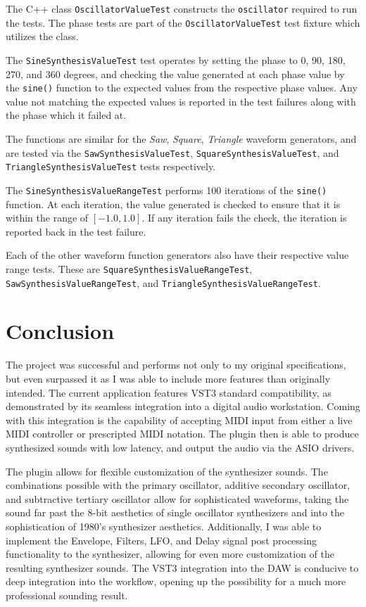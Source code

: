 \documentclass[a4paper,12pt]{report}
\begin{document}
The C++ class \texttt{Oscillator\-Value\-Test} constructs the \texttt{oscillator} required to run the tests. The phase tests are part of the \texttt{Oscillator\-Value\-Test} test fixture which utilizes the class.

The \texttt{Sine\-Synthesis\-Value\-Test} test operates by setting the phase to 0, 90, 180, 270, and 360 degrees, and checking the value generated at each phase value by the \texttt{sine()} function to the expected values from the respective phase values. Any value not matching the expected values is reported in the test failures along with the phase which it failed at.

The functions are similar for the \emph{Saw}, \emph{Square}, \emph{Triangle} waveform generators, and are tested via the \texttt{Saw\-Synthesis\-Value\-Test}, \texttt{Square\-Synthesis\-Value\-Test}, and \texttt{Triangle\-Synthesis\-Value\-Test} tests respectively.

The \texttt{Sine\-Synthesis\-Value\-Range\-Test} performs 100 iterations of the \texttt{sine()} function. At each iteration, the value generated is checked to ensure that it is within the range of $[-1.0,1.0]$. If any iteration fails the check, the iteration is reported back in the test failure.

Each of the other waveform function generators also have their respective value range tests. These are \texttt{Square\-Synthesis\-Value\-Range\-Test}, \texttt{Saw\-Synthesis\-Value\-Range\-Test}, and \texttt{Triangle\-Synthesis\-Value\-Range\-Test}.

\chapter*{Conclusion}
\label{chapter:results}
The project was successful and performs not only to my original specifications, but even surpassed it as I was able to include more features than originally intended. The current application features VST3 standard compatibility, as demonstrated by its seamless integration into a digital audio workstation. Coming with this integration is the capability of accepting MIDI input from either a live MIDI controller or prescripted MIDI notation. The plugin then is able to produce synthesized sounds with low latency, and output the audio via the ASIO drivers.

The plugin allows for flexible customization of the synthesizer sounds. The combinations possible with the primary oscillator, additive secondary oscillator, and subtractive tertiary oscillator allow for sophisticated waveforms, taking the sound far past the 8-bit aesthetics of single oscillator synthesizers and into the sophistication of 1980's synthesizer aesthetics. Additionally, I was able to implement the Envelope, Filters, LFO, and Delay signal post processing functionality to the synthesizer, allowing for even more customization of the resulting synthesizer sounds. The VST3 integration into the DAW is conducive to deep integration into the workflow, opening up the possibility for a much more professional sounding result. 
\end{document}
